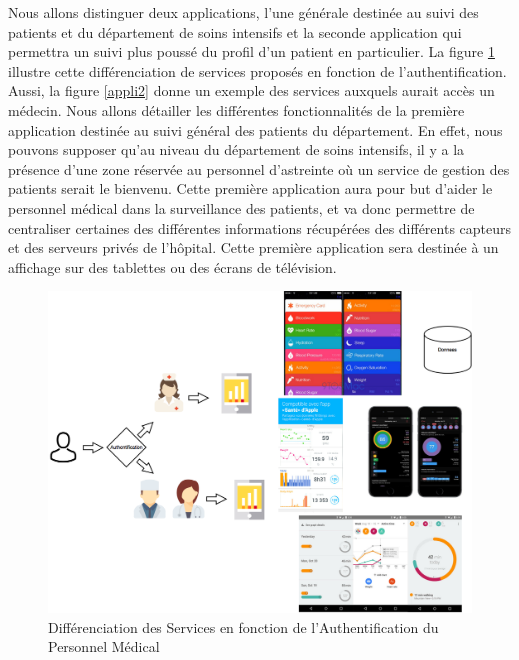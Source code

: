 Nous allons distinguer deux applications, l’une générale destinée au suivi des patients et du département de soins intensifs et la
seconde application qui permettra un suivi plus poussé du profil d’un patient en particulier. La figure \ref{appli} illustre cette
différenciation de services proposés en fonction de l'authentification. Aussi, la figure \ref{appli2} donne un exemple des services auxquels aurait accès un médecin. Nous allons détailler les différentes fonctionnalités de
la première application destinée au suivi général des patients du département. En effet, nous pouvons supposer qu’au niveau du
département de soins intensifs, il y a la présence d’une zone réservée au personnel d’astreinte où un service de gestion des
patients serait le bienvenu. Cette première application aura pour but d’aider le personnel médical dans la surveillance des
patients, et va donc permettre de centraliser certaines des différentes informations récupérées des différents capteurs et des
serveurs privés de l’hôpital. Cette première application sera destinée à un affichage sur des tablettes ou des écrans de télévision.  \\
\begin{figure}[h!]
	\hspace*{-2.5cm}
	\centering
	\includegraphics[width=1.4\textwidth]{Application.png}
	\caption{Différenciation des Services en fonction de l'Authentification du Personnel Médical}
	\label{appli}
\end{figure}

